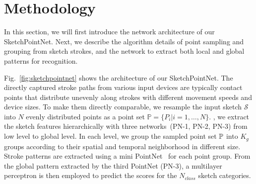 \section{Methodology}
\label{sec:methodology}


In this section, we will first introduce the network architecture of our SketchPointNet. Next, we describe the algorithm details of point sampling and grouping from sketch strokes, and the network to extract both local and global patterns for recognition. 



Fig.~\ref{fig:sketchpointnet} shows the architecture of our SketchPointNet.
%
The directly captured stroke paths from various input devices are typically contact points that distribute unevenly along strokes with different movement speeds and device sizes.
To make them directly comparable, we resample the input sketch $\mathcal{S}$ into $N$ evenly distributed points as a point set $\mathbb{P}=\{P_i|i=1,\ldots,N\}$.
% 
, we extract the sketch features hierarchically with three networks~(PN-1, PN-2, PN-3) from low level to global level.
%
In each level, we group the sampled point set $\mathbb{P}$ into $K_g$ groups according to their spatial and temporal neighborhood in different size.
Stroke patterns are extracted using a mini PointNet~\cite{qi2017pointnetplusplus} for each point group. 
%
From the global pattern extracted by the third PointNet (PN-3), a multilayer perceptron is then employed to predict the scores for the $N_{class}$ sketch categories. 



